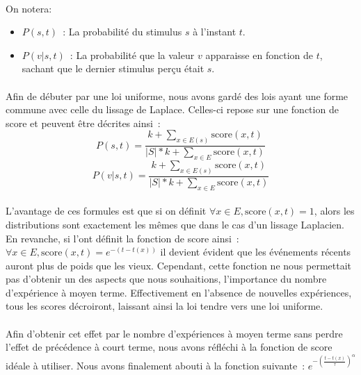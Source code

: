 \paragraph{}
On notera:
\begin{itemize}
\item $P(s, t)$~: La probabilité du stimulus $s$ à l'instant $t$.
\item $P(v|s, t)$~: La probabilité que la valeur $v$ apparaisse en fonction
      de $t$, sachant que le dernier stimulus perçu était $s$.
\end{itemize}
\paragraph{}
Afin de débuter par une loi uniforme, nous avons gardé des lois ayant une
forme commune avec celle du lissage de Laplace. Celles-ci repose sur une
fonction de score et peuvent être décrites ainsi~:
$$P(s,t) = \frac{k + \sum\limits_{x \in E(s)} \mathrm{score}(x, t)}
                {|S| * k + \sum\limits_{x \in E} \mathrm{score}(x, t)}$$
$$P(v| s, t) = \frac{k + \sum\limits_{x \in E(s)} \mathrm{score}(x, t)}
                {|S| * k + \sum\limits_{x \in E} \mathrm{score}(x, t)}$$

\paragraph{}
L'avantage de ces formules est que si on définit
$\forall x \in E, \mathrm{score}(x, t) = 1$, alors les distributions sont
exactement les mêmes que dans le cas d'un lissage Laplacien. En revanche, si
l'ont définit la fonction de score ainsi~:
$\forall x \in E, \mathrm{score}(x, t) = e^{-(t - t(x))}$ il devient évident que
les événements récents auront plus de poids que les vieux. Cependant, cette
fonction ne nous permettait pas d'obtenir un des aspects que nous souhaitions,
l'importance du nombre d'expérience à moyen terme. Effectivement en l'absence
de nouvelles expériences, tous les scores décroiront, laissant ainsi la loi
tendre vers une loi uniforme.

\paragraph{}
Afin d'obtenir cet effet par le nombre d'expériences à moyen terme sans perdre
l'effet de précédence à court terme, nous avons réfléchi à la fonction de
score idéale à utiliser. Nous avons finalement abouti à la fonction suivante~:
$e^{-(\frac{t-t(x)}{\tau})^{\alpha}}$

